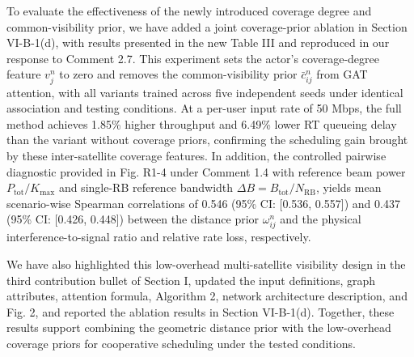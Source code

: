 \documentclass[11pt,a4paper]{article}
\begin{document}
To evaluate the effectiveness of the newly introduced coverage degree and common-visibility prior, we have added a joint coverage-prior ablation in Section VI-B-1(d), with results presented in the new Table III and reproduced in our response to Comment 2.7. This experiment sets the actor's coverage-degree feature $v_j^n$ to zero and removes the common-visibility prior $\bar c_{ij}^n$ from GAT attention, with all variants trained across five independent seeds under identical association and testing conditions. At a per-user input rate of 50 Mbps, the full method achieves 1.85\% higher throughput and 6.49\% lower RT queueing delay than the variant without coverage priors, confirming the scheduling gain brought by these inter-satellite coverage features. In addition, the controlled pairwise diagnostic provided in Fig. R1-4 under Comment 1.4 with reference beam power $P_{\mathrm{tot}}/K_{\max}$ and single-RB reference bandwidth $\Delta B=B_{\mathrm{tot}}/N_{\mathrm{RB}}$, yields mean scenario-wise Spearman correlations of 0.546 (95\% CI: [0.536, 0.557]) and 0.437 (95\% CI: [0.426, 0.448]) between the distance prior $\omega_{ij}^n$ and the physical interference-to-signal ratio and relative rate loss, respectively.
\par

We have also highlighted this low-overhead multi-satellite visibility design in the third contribution bullet of Section I, updated the input definitions, graph attributes, attention formula, Algorithm 2, network architecture description, and Fig. 2, and reported the ablation results in Section VI-B-1(d). Together, these results support combining the geometric distance prior with the low-overhead coverage priors for cooperative scheduling under the tested conditions.
\par

\end{document}
